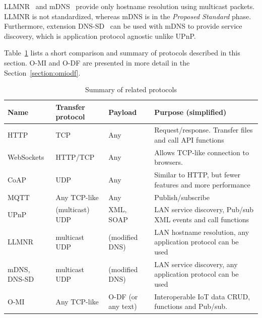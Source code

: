 LLMNR~\cite{Link-Local_Multicast_Name_Resolution_RFC4795} and mDNS~\cite{Multicast_DNS_RFC6762} provide only hostname resolution using multicast packets. LLMNR is not standardized, whereas mDNS is in the \emph{Proposed Standard} phase. Furthermore, extension DNS-SD~\cite{DNS-Based_Service_Discovery_RFC6763} can be used with mDNS to provide service discovery, which is application protocol agnostic  unlike UPnP.


Table~\ref{tab:protocols} lists a short comparison and summary of protocols described in this section. O-MI and O-DF are presented in more detail in the Section~\ref{section:omiodf}.

\bgroup
\def\arraystretch{1.3} %
\begin{table}[H]
  \centering
  \caption{Summary of related protocols}
  \smallskip
  \label{tab:protocols}
  \selectfont %
  \small
  \begin{tabular}{|p{}|p{}|p{}|p{}|}
    \hline
    Name & Transfer \newline protocol & Payload & Purpose (simplified) \\ \hline
    \hline
    HTTP & TCP & Any & Request/response. Transfer files and call API functions \\ \hline
    WebSockets & HTTP/TCP & Any & Allows TCP-like connection to browsers. \\ \hline
    CoAP & UDP & Any & Similar to HTTP, but fewer features and more performance \\ \hline
    MQTT & Any TCP-like & Any & Publish/subscribe \\ \hline
    UPnP & (multicast) UDP & XML, SOAP & LAN service discovery, Pub/sub XML events and call functions \\ \hline
    LLMNR & multicast UDP & (modified DNS) & LAN hostname resolution, any application protocol can be used \\ \hline
    mDNS, DNS-SD & multicast UDP & (modified DNS) & LAN service discovery, any application protocol can be used\\ \hline
    O-MI & Any TCP-like & O-DF (or any text) & Interoperable IoT data CRUD, functions and Pub/sub. \\ \hline
  \end{tabular}
\end{table}
\egroup

